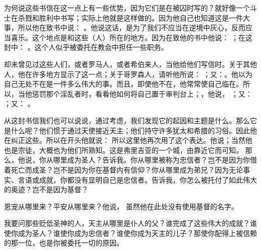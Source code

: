 为何说这些书信在这一点上有一些优势，因为它们是在被囚时写的？就好像一个斗士在杀戮和胜利中书写；实际上他就是这样做的。因为他自己也知道这是一件大事，所以他在致书中说： 。他说这话，是为了我们不应当在逆境中灰心，反而应当喜乐。这个地点是和这些（人）所在的地方。因为在致他的书中他说： ；在这封中： 。这个人似乎被委托在教会中担任一些职务。\par

却未曾见过这些人们，或者罗马人，或者希伯来人，当他给他们写信时。关于其他人，他在许多地方显示了这一点；关于哥罗森人，请听他所说： ；又：。他以为自己无处不在是一件多么伟大的事。而且，即使他不在，他常常使自己临在。所以，当他惩罚那个淫乱者时，看看他如何将自己置于审判台上；，他说， ；又： ；又： 。\par

\par

从这封书信我们也可以说说，通过考虑，我们发现它的起因和主题是什么。那么它是什么呢？他们惯于通过天使接近天主；他们持守许多犹太和希腊的习俗。因此他在纠正这些。所以在开头他就说： 所以这里他再次用了这个表达。他说；当然他也是宗徒，大概也为他们所熟知。这是弗里吉亚的一个城，由靠近它而可知。  那么，他说，你从哪里成为圣人？告诉我。你从哪里被称为忠信者？岂不是因为你借着死亡而成圣？岂不是因为你在基督内有信仰？你从哪里成为弟兄？因为无论事实、言语或成就，你都没有显明自己是忠信者。告诉我，你怎么被托付了如此伟大的奥迹？岂不是因为基督？\par

 恩宠从哪里来？平安从哪里来？他说， 虽然他在此处没有使用基督的名字。\par

我要问那些贬低圣神的人，天主从哪里是仆人的父？谁完成了这些伟大的成就？谁使你成为圣人？谁使你成为忠信者？谁使你成为天主的儿子？那使你配得上被信赖的那一位，也是你被委托一切的原因。\par

